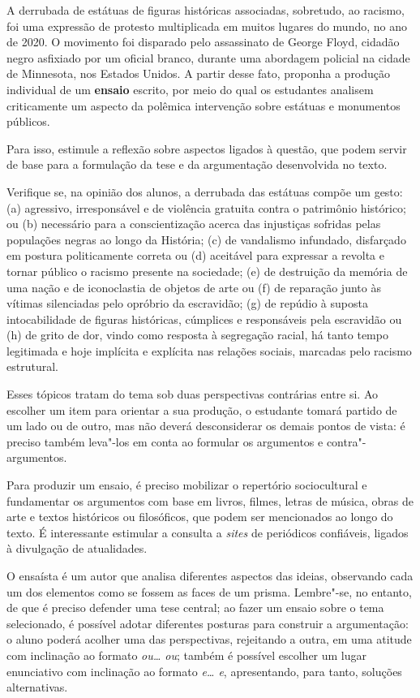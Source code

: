 \documentclass[11pt]{extarticle}
\begin{document}
  A derrubada de estátuas de figuras históricas associadas, sobretudo,
  ao racismo, foi uma expressão de protesto multiplicada em muitos
  lugares do mundo, no ano de 2020. O movimento foi disparado pelo
  assassinato de George Floyd, cidadão negro asfixiado por um oficial
  branco, durante uma abordagem policial na cidade de Minnesota, nos
  Estados Unidos. A partir desse fato, proponha a produção individual de
  um \textbf{ensaio} escrito, por meio do qual os estudantes analisem
  criticamente um aspecto da polêmica intervenção sobre estátuas e
  monumentos públicos.

  Para isso, estimule a reflexão sobre aspectos
  ligados à questão, que podem servir de base para a formulação da tese
  e da argumentação desenvolvida no texto.

Verifique se, na opinião dos alunos, a derrubada das estátuas compõe um
gesto: (a) agressivo, irresponsável e de violência gratuita contra o
patrimônio histórico; ou (b) necessário para a conscientização acerca
das injustiças sofridas pelas populações negras ao longo da História;
(c) de vandalismo infundado, disfarçado em postura politicamente correta
ou (d) aceitável para expressar a revolta e tornar público o racismo
presente na sociedade; (e) de destruição da memória de uma nação e de
iconoclastia de objetos de arte ou (f) de reparação junto às vítimas
silenciadas pelo opróbrio da escravidão; (g) de repúdio à suposta
intocabilidade de figuras históricas, cúmplices e responsáveis pela
escravidão ou (h) de grito de dor, vindo como resposta à segregação
racial, há tanto tempo legitimada e hoje implícita e explícita nas
relações sociais, marcadas pelo racismo estrutural.

Esses tópicos tratam do tema sob duas perspectivas contrárias entre si.
Ao escolher um item para orientar a sua produção, o estudante tomará
partido de um lado ou de outro, mas não deverá desconsiderar os demais
pontos de vista: é preciso também leva"-los em conta ao formular os
argumentos e contra"-argumentos.

Para produzir um ensaio, é preciso mobilizar o repertório sociocultural
e fundamentar os argumentos com base em livros, filmes, letras de
música, obras de arte e textos históricos ou filosóficos, que podem ser
mencionados ao longo do texto. É interessante estimular a consulta a
\emph{sites} de periódicos confiáveis, ligados à divulgação de
atualidades.

O ensaísta é um autor que analisa diferentes aspectos das ideias,
observando cada um dos elementos como se fossem as faces de um prisma.
Lembre"-se, no entanto, de que é preciso defender uma tese central; ao
fazer um ensaio sobre o tema selecionado, é possível adotar diferentes
posturas para construir a argumentação: o aluno poderá acolher uma das
perspectivas, rejeitando a outra, em uma atitude com inclinação ao
formato \emph{ou\ldots{} ou}; também é possível escolher um lugar enunciativo
com inclinação ao formato \emph{e\ldots{} e}, apresentando, para tanto,
soluções alternativas.
\end{document}
